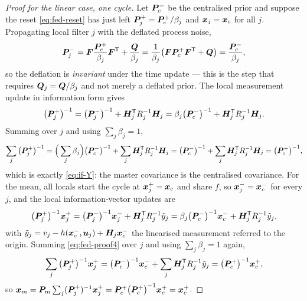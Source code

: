 \begin{proof}[Proof for the linear case, one cycle]
Let $\bm{P}_c^-$ be the centralised prior and suppose the reset \eqref{eq:fed-reset} has just left
$\bm{P}_j^+ = \bm{P}_c^+/\beta_j$ and $\bm{x}_j=\bm{x}_c$ for all $j$. Propagating local filter $j$ with the
deflated process noise,
\begin{equation}
\bm{P}_j^- = \bm{F}\frac{\bm{P}_c^+}{\beta_j}\bm{F}^{\mathsf{T}} + \frac{\bm{Q}}{\beta_j}
        = \frac{1}{\beta_j}\big(\bm{F}\bm{P}_c^+\bm{F}^{\mathsf{T}}+\bm{Q}\big) = \frac{\bm{P}_c^-}{\beta_j},
\label{eq:fed-proof1}
\end{equation}
so the deflation is \emph{invariant} under the time update --- this is the step that requires
$\bm{Q}_j=\bm{Q}/\beta_j$ and not merely a deflated prior. The local measurement update in information
form gives
\begin{equation}
\big(\bm{P}_j^+\big)^{-1} = \big(\bm{P}_j^-\big)^{-1} + \bm{H}_j^{\mathsf{T}} R_j^{-1}\bm{H}_j
 = \beta_j\big(\bm{P}_c^-\big)^{-1} + \bm{H}_j^{\mathsf{T}} R_j^{-1}\bm{H}_j .
\label{eq:fed-proof2}
\end{equation}
Summing over $j$ and using $\sum_j\beta_j=1$,
\begin{equation}
\sum_{j}\big(\bm{P}_j^+\big)^{-1} = \Big(\sum_j\beta_j\Big)\big(\bm{P}_c^-\big)^{-1} + \sum_j \bm{H}_j^{\mathsf{T}} R_j^{-1}\bm{H}_j
 = \big(\bm{P}_c^-\big)^{-1} + \sum_j\bm{H}_j^{\mathsf{T}} R_j^{-1}\bm{H}_j = \big(\bm{P}_c^+\big)^{-1},
\label{eq:fed-proof3}
\end{equation}
which is exactly \eqref{eq:if-Y}: the master covariance is the centralised covariance. For the
mean, all locals start the cycle at $\bm{x}_j^+=\bm{x}_c$ and share $f$, so $\bm{x}_j^-=\bm{x}_c^-$ for every
$j$, and the local information-vector updates are
\begin{equation}
\big(\bm{P}_j^+\big)^{-1}\bm{x}_j^+ = \big(\bm{P}_j^-\big)^{-1}\bm{x}_j^- + \bm{H}_j^{\mathsf{T}} R_j^{-1}\tilde y_j
 = \beta_j\big(\bm{P}_c^-\big)^{-1}\bm{x}_c^- + \bm{H}_j^{\mathsf{T}} R_j^{-1}\tilde y_j ,
\label{eq:fed-proof4}
\end{equation}
with $\tilde y_j = v_j - h(\bm{x}_c^-,\bm{u}_j) + \bm{H}_j\bm{x}_c^-$ the linearised measurement referred to
the origin. Summing \eqref{eq:fed-proof4} over $j$ and using $\sum_j\beta_j=1$ again,
\begin{equation}
\sum_j\big(\bm{P}_j^+\big)^{-1}\bm{x}_j^+ = \big(\bm{P}_c^-\big)^{-1}\bm{x}_c^- + \sum_j\bm{H}_j^{\mathsf{T}} R_j^{-1}\tilde y_j
 = \big(\bm{P}_c^+\big)^{-1}\bm{x}_c^+ ,
\label{eq:fed-proof5}
\end{equation}
so $\bm{x}_m = \bm{P}_m\sum_j(\bm{P}_j^+)^{-1}\bm{x}_j^+ = \bm{P}_c^+\big(\bm{P}_c^+\big)^{-1}\bm{x}_c^+ = \bm{x}_c^+$.
\end{proof}

